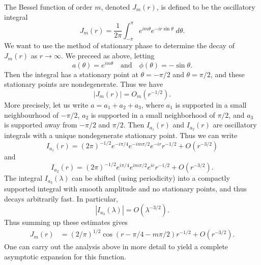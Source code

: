 \begin{example}
  The Bessel function of order $m$, denoted $J_m(r)$, is defined to be the oscillatory integral
  \[ J_m(r) = \frac{1}{2\pi} \int_{-\pi}^\pi e^{i m \theta} e^{- i r \sin \theta}\; d\theta. \]
  We want to use the method of stationary phase to determine the decay of $J_m(r)$ as $r \to \infty$. We preceed as above, letting
  \[ a(\theta) = e^{im \theta} \quad\text{and}\quad \phi(\theta) = - \sin \theta. \]
  Then the integral has a stationary point at $\theta = - \pi/2$ and $\theta = \pi/2$, and these stationary points are nondegenerate. Thus we have
  \[ |J_m(r)| = O_m(r^{-1/2}). \]
  More precisely, let us write $a = a_1 + a_2 + a_3$, where $a_1$ is supported in a small neighbourhood of $-\pi/2$,  $a_2$ is supported in a small neighborhood of $\pi/2$, and $a_3$ is supported away from $-\pi/2$ and $\pi/2$. Then $I_{a_1}(r)$ and $I_{a_2}(r)$ are oscillatory integrals with a unique nondegenerate stationary point. Thus we can write
  \[ I_{a_1}(r) = (2\pi)^{-1/2} e^{-i\pi/4} e^{-im \pi / 2} e^{- i r} r^{-1/2} + O(r^{-3/2}) \]
  and
  \[ I_{a_2}(r) = (2\pi)^{-1/2} e^{i \pi / 4} e^{i m \pi / 2} e^{i r} r^{-1/2} + O(r^{-3/2}). \]
  The integral $I_{a_3}(\lambda)$ can be shifted (using periodicity) into a compactly supported integral with smooth amplitude and no stationary points, and thus decays arbitrarily fast. In particular,
  \[ |I_{a_3}(\lambda)| = O(\lambda^{-3/2}). \]
  Thus summing up these estimates gives
  \begin{align*}
    J_m(r) &= (2/\pi)^{1/2} \cos(r - \pi/4 - m \pi / 2) r^{-1/2} + O(r^{-3/2}).
  \end{align*}
  One can carry out the analysis above in more detail to yield a complete asymptotic expansion for this function.

\end{example}

